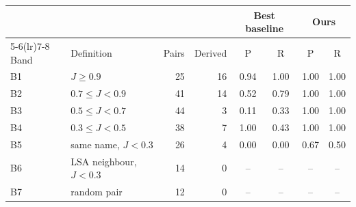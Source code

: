 \begin{tabular}{llrrcccc}
\toprule
 & & & & \multicolumn{2}{c}{Best baseline} & \multicolumn{2}{c}{Ours} \\
\cmidrule(lr){5-6}\cmidrule(lr){7-8}
Band & Definition & Pairs & Derived & P & R & P & R \\
\midrule
B1 & $J \geq 0.9$ & 25 & 16 & 0.94 & 1.00 & 1.00 & 1.00 \\
B2 & $0.7 \leq J < 0.9$ & 41 & 14 & 0.52 & 0.79 & 1.00 & 1.00 \\
B3 & $0.5 \leq J < 0.7$ & 44 & 3 & 0.11 & 0.33 & 1.00 & 1.00 \\
B4 & $0.3 \leq J < 0.5$ & 38 & 7 & 1.00 & 0.43 & 1.00 & 1.00 \\
B5 & same name, $J<0.3$ & 26 & 4 & 0.00 & 0.00 & 0.67 & 0.50 \\
B6 & LSA neighbour, $J<0.3$ & 14 & 0 & -- & -- & -- & -- \\
B7 & random pair & 12 & 0 & -- & -- & -- & -- \\
\bottomrule
\end{tabular}
